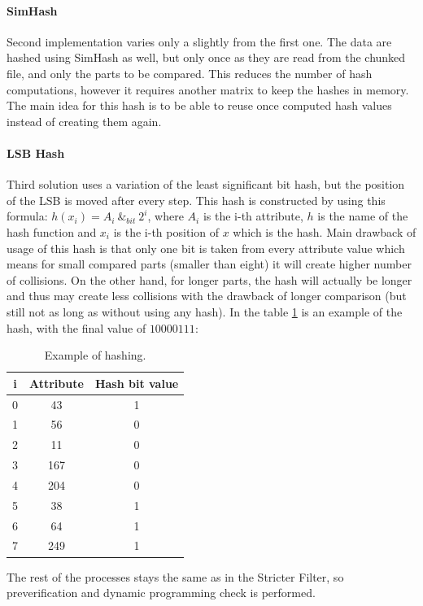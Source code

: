 \paragraph{SimHash} Second implementation varies only a slightly from the first one. The data are hashed using SimHash as well, but only once as they are read from the chunked file, and only the parts to be compared. This reduces the number of hash computations, however it requires another matrix to keep the hashes in memory. The main idea for this hash is to be able to reuse once computed hash values instead of creating them again.

\paragraph{LSB Hash} Third solution uses a variation of the least significant bit hash, but the position of the LSB is moved after every step. This hash is constructed by using this formula: $h(x_i) = A_i\ \&_{bit}\ 2^i$, where $A_i$ is the i-th attribute, $h$ is the name of the hash function and $x_i$ is the i-th position of $x$ which is the hash. Main drawback of usage of this hash is that only one bit is taken from every attribute value which means for small compared parts (smaller than eight) it will create higher number of collisions. On the other hand, for longer parts, the hash will actually be longer and thus may create less collisions with the drawback of longer comparison (but still not as long as without using any hash). 
In the table \ref{hashTab} is an example of the hash, with the final value of $10000111$:  
\begin{table}
\centering
\begin{tabular}{| c | c | c |}
\hline
i & Attribute & Hash bit value \\
\hline
0 & 43 & 1 \\
\hline
1 & 56 & 0 \\
\hline
2 & 11 & 0 \\
\hline
3 & 167 & 0 \\
\hline
4 & 204 & 0 \\
\hline
5 & 38 & 1 \\
\hline
6 & 64 & 1 \\
\hline
7 & 249 & 1 \\
\hline
\end{tabular}
\caption{Example of hashing.}
\label{hashTab}
\end{table}
\newline
\newline
The rest of the processes stays the same as in the Stricter Filter, so preverification and dynamic programming check is performed.

